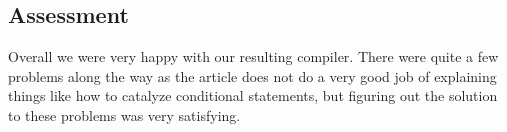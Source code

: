\subsection{Assessment}
Overall we were very happy with our resulting compiler. There were quite a few problems along the way as the article does not do a very good job of explaining things like how to catalyze conditional statements, but figuring out the solution to these problems was very satisfying.
